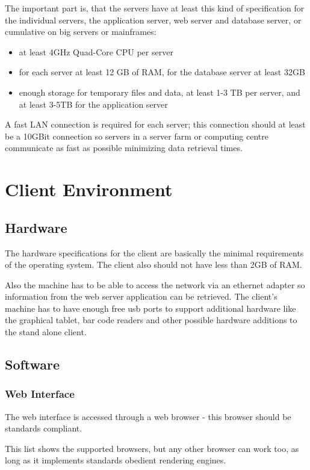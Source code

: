 \documentclass[11pt,a4paper,oneside,svgnames]{report}
\begin{document}
The important part is, that the servers have at least this kind of specification for the individual servers, the application server, web server and database server, or cumulative on big servers or mainframes:

\begin{itemize}
	\item at least 4GHz Quad-Core CPU per server
	\item for each server at least 12 GB of RAM, for the database server at least 32GB
	\item enough storage for temporary files and data, at least 1-3 TB per server, and at least 3-5TB for the application server
\end{itemize}

A fast LAN connection is required for each server; this connection should at least be a 10GBit connection so servers in a server farm or computing centre communicate as fast as possible minimizing data retrieval times.

\section{Client Environment}
\subsection{Hardware}
The hardware specifications for the client are basically the minimal requirements of the operating system. The client also should not have less than 2GB of RAM.

Also the machine has to be able to access the network via an ethernet adapter so information from the web server application can be retrieved. The client's machine has to have enough free usb ports to support additional hardware like the graphical tablet, bar code readers and other possible hardware additions to the stand alone client.
\subsection{Software}
\subsubsection{Web Interface}
The web interface is accessed through a web browser - this browser should be standards compliant.

This list shows the supported browsers, but any other browser can work too, as long as it implements standards obedient rendering engines.
\end{document}
